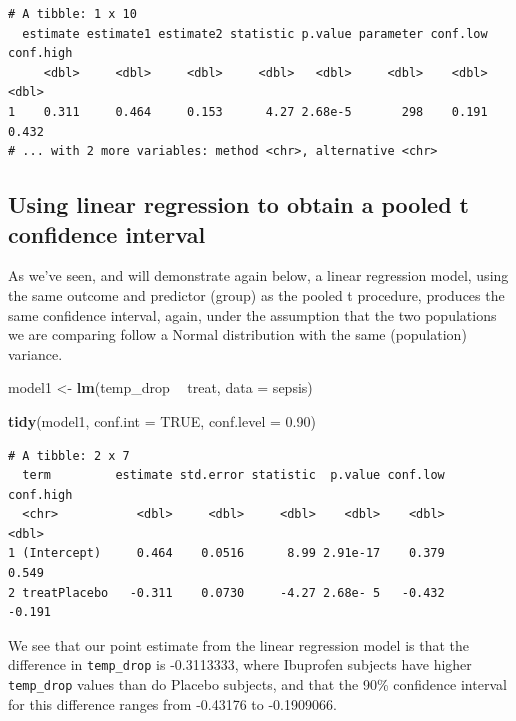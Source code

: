 \documentclass[
]{book}
\newenvironment{Shaded}{\begin{snugshade}}{\end{snugshade}}
\newcommand{\DataTypeTok}[1]{\textcolor[rgb]{0.13,0.29,0.53}{#1}}
\newcommand{\FloatTok}[1]{\textcolor[rgb]{0.00,0.00,0.81}{#1}}
\newcommand{\KeywordTok}[1]{\textcolor[rgb]{0.13,0.29,0.53}{\textbf{#1}}}
\newcommand{\NormalTok}[1]{#1}
\newcommand{\OperatorTok}[1]{\textcolor[rgb]{0.81,0.36,0.00}{\textbf{#1}}}
\newcommand{\OtherTok}[1]{\textcolor[rgb]{0.56,0.35,0.01}{#1}}
\newcommand{\StringTok}[1]{\textcolor[rgb]{0.31,0.60,0.02}{#1}}
\begin{document}
\begin{verbatim}
# A tibble: 1 x 10
  estimate estimate1 estimate2 statistic p.value parameter conf.low conf.high
     <dbl>     <dbl>     <dbl>     <dbl>   <dbl>     <dbl>    <dbl>     <dbl>
1    0.311     0.464     0.153      4.27 2.68e-5       298    0.191     0.432
# ... with 2 more variables: method <chr>, alternative <chr>
\end{verbatim}

\hypertarget{using-linear-regression-to-obtain-a-pooled-t-confidence-interval}{%
\subsection{Using linear regression to obtain a pooled t confidence interval}\label{using-linear-regression-to-obtain-a-pooled-t-confidence-interval}}

As we've seen, and will demonstrate again below, a linear regression model, using the same outcome and predictor (group) as the pooled t procedure, produces the same confidence interval, again, under the assumption that the two populations we are comparing follow a Normal distribution with the same (population) variance.

\begin{Shaded}
\begin{Highlighting}[]
\NormalTok{model1 <-}\StringTok{ }\KeywordTok{lm}\NormalTok{(temp_drop }\OperatorTok{~}\StringTok{ }\NormalTok{treat, }\DataTypeTok{data =}\NormalTok{ sepsis)}

\KeywordTok{tidy}\NormalTok{(model1, }\DataTypeTok{conf.int =} \OtherTok{TRUE}\NormalTok{, }\DataTypeTok{conf.level =} \FloatTok{0.90}\NormalTok{)}
\end{Highlighting}
\end{Shaded}

\begin{verbatim}
# A tibble: 2 x 7
  term         estimate std.error statistic  p.value conf.low conf.high
  <chr>           <dbl>     <dbl>     <dbl>    <dbl>    <dbl>     <dbl>
1 (Intercept)     0.464    0.0516      8.99 2.91e-17    0.379     0.549
2 treatPlacebo   -0.311    0.0730     -4.27 2.68e- 5   -0.432    -0.191
\end{verbatim}

We see that our point estimate from the linear regression model is that the difference in \texttt{temp\_drop} is -0.3113333, where Ibuprofen subjects have higher \texttt{temp\_drop} values than do Placebo subjects, and that the 90\% confidence interval for this difference ranges from -0.43176 to -0.1909066.
\end{document}
